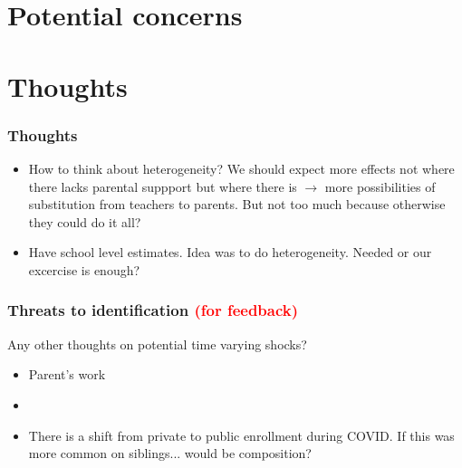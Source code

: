 
\section{Potential concerns}




\section{Thoughts}

\begin{frame}
    \label{frame:thoughts}
    \frametitle{Thoughts}
    \begin{itemize}
        \item How to think about heterogeneity? We should expect more effects not where there lacks parental suppport but where there is $\rightarrow$ more possibilities of substitution from teachers to parents. But not too much because otherwise they could do it all?
        \item Have school level estimates. Idea was to do heterogeneity. Needed or our excercise is enough?
    \end{itemize}


\end{frame}


\begin{frame}
    \label{frame:research_feedback}
    \frametitle{Threats to identification \textcolor{red}{(for feedback)}}
        Any other thoughts on potential time varying shocks?
        \begin{itemize}
            \item Parent's work
            \item 
            \item There is a shift from private to public enrollment during COVID. If this was more common on siblings... would be composition?
        \end{itemize}

 
    \begin{flushleft}
        \hyperlink{frame:research}{}
    \end{flushleft}
    
\end{frame}


